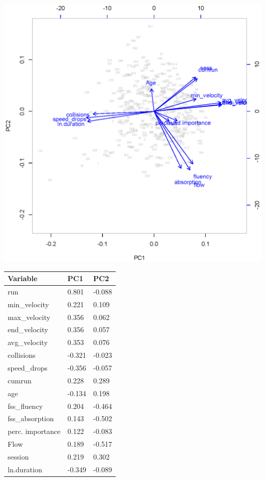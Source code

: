 \documentclass[fleqn,10pt]{wlscirep}
\begin{document}
\noindent
\begin{minipage}{\textwidth}
\begin{minipage}{.6\textwidth}
\centering
\includegraphics[width=\linewidth]{suppl_pca}
\label{fig:supp_boxes}
\end{minipage}%
\begin{minipage}{.4\textwidth}
\begin{tabular}{lll}
{\bf Variable}   &{\bf PC1}&{\bf PC2}\\
\hline
run              & 0.801  & -0.088 \\
min\_velocity    & 0.221  & 0.109  \\
max\_velocity    & 0.356  & 0.062  \\
end\_velocity    & 0.356  & 0.057  \\
avg\_velocity    & 0.353  & 0.076  \\
collisions       & -0.321 & -0.023 \\
speed\_drops     & -0.356 & -0.057 \\
cumrun           & 0.228  & 0.289  \\
age              & -0.134 & 0.198  \\
fss\_fluency     & 0.204  & -0.464 \\
fss\_absorption  & 0.143  & -0.502 \\
perc. importance & 0.122  & -0.083 \\
Flow             & 0.189  & -0.517 \\
session          & 0.219  & 0.302  \\
ln.duration      & -0.349 & -0.089
\end{tabular}
\end{minipage}
\end{minipage}
\end{document}
